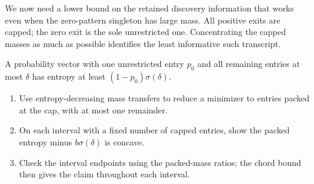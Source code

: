 We now need a lower bound on the retained discovery information
that works even when the zero-pattern singleton has large mass.
All positive exits are capped; the zero exit is the sole
unrestricted one. Concentrating the capped masses as much as
possible identifies the least informative such transcript.
\begin{claim}
\label{lem:capped-discovery-entropy}
A probability vector with one unrestricted entry $p_0$ and all
remaining entries at most $\delta$ has entropy at least
$(1-p_0)\sigma(\delta)$.
\end{claim}
\begin{proofstrategy}
\begin{enumerate}
\item Use entropy-decreasing mass transfers to reduce a minimizer to
      entries packed at the cap, with at most one remainder.
\item On each interval with a fixed number of capped entries, show the
      packed entropy minus $b\sigma(\delta)$ is concave.
\item Check the interval endpoints using the packed-mass ratios; the
      chord bound then gives the claim throughout each interval.
\end{enumerate}
\end{proofstrategy}
